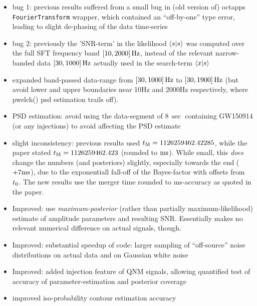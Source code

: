 \documentclass[aps,prd,onecolumn,notitlepage,nofootinbib,superscriptaddress,altaffilletter,floatfix]{revtex4-1}
\begin{document}
\begin{itemize}
\item bug 1: previous results suffered from a small bug in (old version of) octapps \texttt{FourierTransform} wrapper, which contained an ``off-by-one'' type
  error, leading to slight de-phasing of the data time-series

\item bug 2: previously the 'SNR-term' in the likelihood $\langle s|s\rangle$ was computed over the full SFT frequency band $[10,2000]\,\mathrm{Hz}$, instead of
  the relevant narrow-banded data $[30,1000]\,\mathrm{Hz}$ actually used in the search-term $\langle x|s\rangle$

\item expanded band-passed data-range from ${[30,1000]}\,\mathrm{Hz}$ to ${[30,1900]}\,\mathrm{Hz}$ (but avoid lower and upper boundaries near 10Hz and 2000Hz respectively, where pwelch() psd estimation trails off).

\item PSD estimation: avoid using the data-segment of $8\,\sec$ containing GW150914 (or any injections) to avoid affecting the PSD estimate

\item slight inconsistency: previous results used  $t_{\mathrm{M}} = 1126259462.42285$, while the paper stated  $t_{\mathrm{M}} = 1126259462.423$
  (rounded to $\mathrm{ms}$). While small, this \emph{does} change the numbers (and posteriors) slightly, especially towards the end ($+7\mathrm{ms}$), due to the
  exponentiall fall-off of the Bayes-factor with offsets from $t_0$. The new results use the merger time rounded to ms-accuracy as quoted in the
  paper.

\item Improved: use \emph{maximum-posterior} (rather than partially maximum-likelihood) estimate of amplitude parameters and resulting SNR. Essentially
  makes no relevant numerical difference on actual signals, though.

\item Improved: substantial speedup of code: larger sampling of ``off-source'' noise distributions on actual data and on Gaussian white noise

\item Improved: added injection feature of QNM signals, allowing quantified test of accuracy of parameter-estimation and posterior coverage

\item improved iso-probability contour estimation accuracy

\end{itemize}
\end{document}
